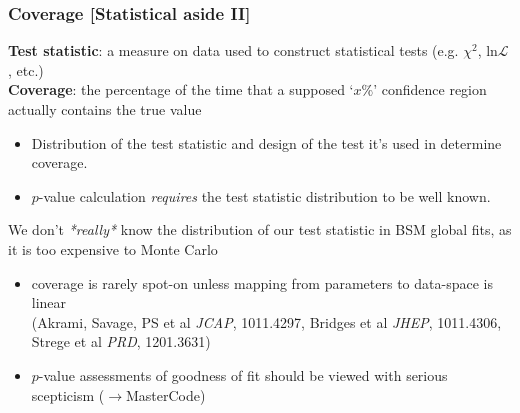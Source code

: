 \documentclass[xcolor=dvipsnames]{beamer}
\newcommand{\cblue}[1]{{\color[rgb]{0.1, 0.0, 0.6} #1}}
\begin{document}
\begin{frame}
\frametitle{Coverage [\alert{Statistical aside II}]}

{\scriptsize
\textbf{Test statistic}: a measure on data used to construct statistical tests (e.g. $\chi^2$, ln$\mathcal{L}$, etc.)\\
\textbf{Coverage}: the percentage of the time that a supposed `$x\%$' confidence region\\ actually contains the true value\\
\begin{itemize}
\item Distribution of the test statistic and design of the test it's used in determine coverage.
\item $p$-value calculation \textit{requires} the test statistic distribution to be well known.
\end{itemize}
}\vspace{3mm}

\cblue{We don't \textit{*really*} know the distribution of our test statistic in BSM global fits, as it is too expensive to Monte Carlo}
      \begin{itemize}\footnotesize
                 \item coverage is rarely spot-on unless mapping from parameters to data-space is linear \\
                 {\tiny(Akrami, Savage, PS et al {\it JCAP}, 1011.4297, Bridges et al {\it JHEP}, 1011.4306, Strege et al {\it PRD}, 1201.3631)}
                 \item $p$-value assessments of goodness of fit should be viewed with serious scepticism ($\rightarrow$MasterCode)
                 \end{itemize}

\end{frame}
\end{document}
